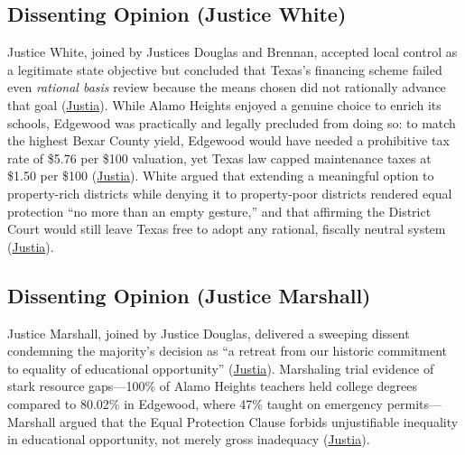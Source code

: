\documentclass[12pt]{article}
\begin{document}
\subsection{Dissenting Opinion (Justice White)}

Justice White, joined by Justices Douglas and Brennan, accepted local control as a legitimate state objective but concluded that Texas's financing scheme failed even \emph{rational basis} review because the means chosen did not rationally advance that goal (\href{https://supreme.justia.com/cases/federal/us/411/1/}{Justia}). While Alamo Heights enjoyed a genuine choice to enrich its schools, Edgewood was practically and legally precluded from doing so: to match the highest Bexar County yield, Edgewood would have needed a prohibitive tax rate of \$5.76 per \$100 valuation, yet Texas law capped maintenance taxes at \$1.50 per \$100 (\href{https://supreme.justia.com/cases/federal/us/411/1/}{Justia}). White argued that extending a meaningful option to property-rich districts while denying it to property-poor districts rendered equal protection ``no more than an empty gesture,'' and that affirming the District Court would still leave Texas free to adopt any rational, fiscally neutral system (\href{https://supreme.justia.com/cases/federal/us/411/1/}{Justia}).

\subsection{Dissenting Opinion (Justice Marshall)}

Justice Marshall, joined by Justice Douglas, delivered a sweeping dissent condemning the majority's decision as ``a retreat from our historic commitment to equality of educational opportunity'' (\href{https://supreme.justia.com/cases/federal/us/411/1/}{Justia}). Marshaling trial evidence of stark resource gaps---100\% of Alamo Heights teachers held college degrees compared to 80.02\% in Edgewood, where 47\% taught on emergency permits---Marshall argued that the Equal Protection Clause forbids unjustifiable inequality in educational opportunity, not merely gross inadequacy (\href{https://supreme.justia.com/cases/federal/us/411/1/}{Justia}).
\end{document}
